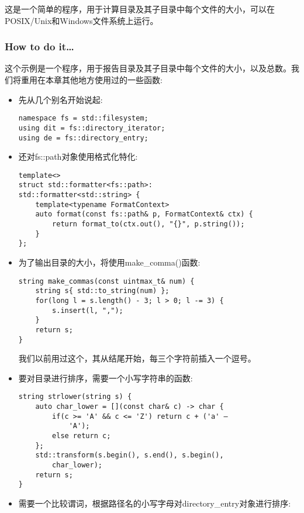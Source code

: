 
这是一个简单的程序，用于计算目录及其子目录中每个文件的大小，可以在POSIX/Unix和Windows文件系统上运行。

\subsubsection{How to do it…}

这个示例是一个程序，用于报告目录及其子目录中每个文件的大小，以及总数。我们将重用在本章其他地方使用过的一些函数:

\begin{itemize}
\item 
先从几个别名开始说起:

\begin{lstlisting}[style=styleCXX]
namespace fs = std::filesystem;
using dit = fs::directory_iterator;
using de = fs::directory_entry;
\end{lstlisting}

\item 
还对fs::path对象使用格式化特化:

\begin{lstlisting}[style=styleCXX]
template<>
struct std::formatter<fs::path>:
std::formatter<std::string> {
	template<typename FormatContext>
	auto format(const fs::path& p, FormatContext& ctx) {
		return format_to(ctx.out(), "{}", p.string());
	}
};
\end{lstlisting}

\item 
为了输出目录的大小，将使用make\_comma()函数:

\begin{lstlisting}[style=styleCXX]
string make_commas(const uintmax_t& num) {
	string s{ std::to_string(num) };
	for(long l = s.length() - 3; l > 0; l -= 3) {
		s.insert(l, ",");
	}
	return s;
}
\end{lstlisting}

我们以前用过这个，其从结尾开始，每三个字符前插入一个逗号。

\item 
要对目录进行排序，需要一个小写字符串的函数:

\begin{lstlisting}[style=styleCXX]
string strlower(string s) {
	auto char_lower = [](const char& c) -> char {
		if(c >= 'A' && c <= 'Z') return c + ('a' –
			'A');
		else return c;
	};
	std::transform(s.begin(), s.end(), s.begin(),
		char_lower);
	return s;
}
\end{lstlisting}

\item 
需要一个比较谓词，根据路径名的小写字母对directory\_entry对象进行排序:


\end{itemize}

